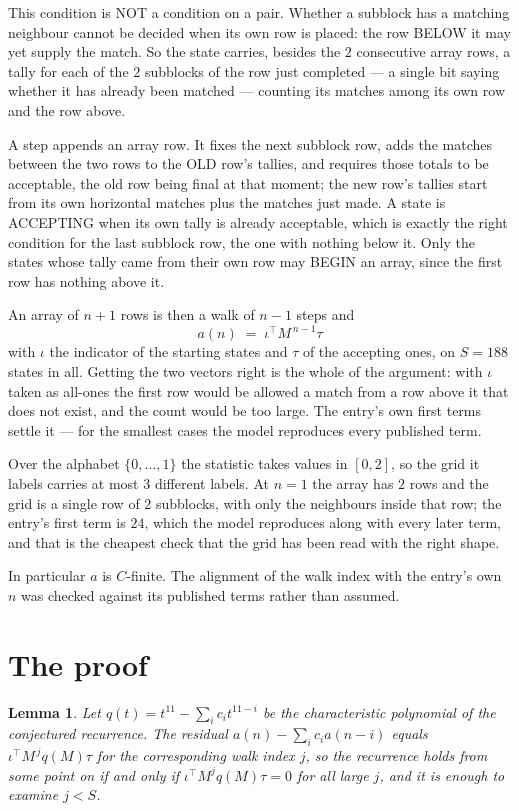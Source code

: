 \documentclass[11pt,a4paper]{article}
\theoremstyle{plain}
\newtheorem{lemma}[theorem]{Lemma}
\theoremstyle{definition}
\begin{document}
This condition is NOT a condition on a pair. Whether a subblock has a
matching neighbour cannot be decided when its own row is placed: the row BELOW it may yet
supply the match. So the state carries, besides the $2$ consecutive array rows, a tally for
each of the $2$ subblocks of the row just completed --- a single bit saying whether it has already been matched --- counting its matches
among its own row and the row above.

A step appends an array row. It fixes the next subblock row, adds the matches between the two
rows to the OLD row's tallies, and requires those totals to be acceptable, the old row being
final at that moment; the new row's tallies start from its own horizontal matches plus the
matches just made. A state is ACCEPTING when its own tally is already acceptable, which is
exactly the right condition for the last subblock row, the one with nothing below it. Only the
states whose tally came from their own row may BEGIN an array, since the first row has nothing
above it.

An array of $n+1$ rows is then a walk of $n-1$ steps and
\[
a(n)\;=\;\iota^{\!\top}M^{\,n-1}\tau
\]
with $\iota$ the indicator of the starting states and $\tau$ of the accepting ones, on
$S=188$ states in all. Getting the two vectors right is the whole of the argument: with
$\iota$ taken as all-ones the first row would be allowed a match from a row above it that does
not exist, and the count would be too large. The entry's own first terms settle it --- for
the smallest cases
the model reproduces every published term.

Over the alphabet $\{0,\dots,1\}$ the statistic takes values in $[0,2]$, so the
grid it labels carries at most $3$ different labels. At $n=1$ the array has $2$
rows and the grid is a single row of $2$
subblocks, with only the neighbours inside that row; the entry's first term is
$24$, which the model reproduces along with every later term, and that is the cheapest
check that the grid has been read with the right shape.

In particular $a$ is $C$-finite. The alignment of the walk index with the entry's own $n$ was
checked against its published terms rather than assumed.

\section{The proof}

\begin{lemma}\label{lem:crit}
Let $q(t)=t^{11}-\sum_i c_it^{11-i}$ be the characteristic polynomial of the
conjectured recurrence. The residual $a(n)-\sum_ic_ia(n-i)$ equals
$\iota^{\!\top}M^{\,j}q(M)\tau$ for the corresponding walk index $j$, so the recurrence
holds from some point on if and only if $\iota^{\!\top}M^{j}q(M)\tau=0$ for all large $j$,
and it is enough to examine $j<S$.
\end{lemma}
\end{document}
